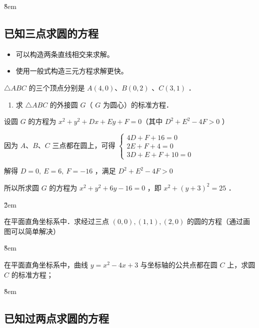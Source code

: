 \v{8em}

\subsection{已知三点求圆的方程}

\begin{theorem}
    \begin{itemize}
        \item 可以构造两条直线相交来求解。
        \item 使用一般式构造三元方程求解更快。
    \end{itemize}
\end{theorem}

\begin{example}
    $\triangle A B C$ 的三个顶点分别是 $A(4,0)$、$B(0,2)$ 、$C(3,1)$ ．
    \begin{enumerate}
        \item 求 $\triangle A B C$ 的外接圆 $G$（ $G$ 为圆心）的标准方程．
    \end{enumerate}
\end{example}

\begin{solution}
    设圆 $G$ 的方程为 $x^2+y^2+D x+E y+F=0$（其中 $D^2+E^2-4 F>0$ ）

    因为 $A 、 B 、 C$ 三点都在圆上，可得 $\left\{\begin{array}{l}4 D+F+16=0 \\ 2 E+F+4=0 \\ 3 D+E+F+10=0\end{array}\right.$

    解得 $D=0, ~ E=6, ~ F=-16$ ，满足 $D^2+E^2-4 F>0$

    所以所求圆 $G$ 的方程为 $x^2+y^2+6 y-16=0$ ，即 $x^2+(y+3)^2=25$ ．
\end{solution}

\v{2em}

\begin{example}
    在平面直角坐标系中．求经过三点 $(0,0),(1,1),(2,0)$ 的圆的方程（通过画图可以简单解决）
\end{example}

\v{8em}

\begin{example}
    在平面直角坐标系中，曲线 $y=x^2-4 x+3$ 与坐标轴的公共点都在圆 $C$ 上，求圆 $C$ 的标准方程；
\end{example}

\v{8em}

\subsection{已知过两点求圆的方程}

